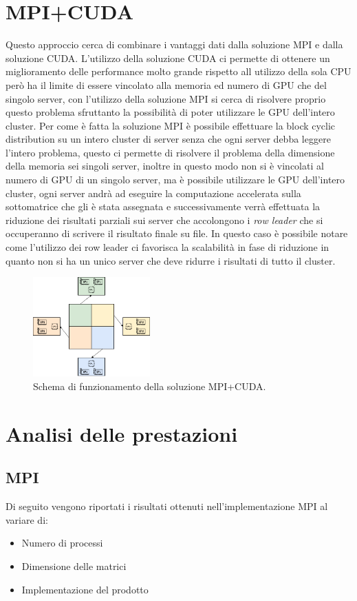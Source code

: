\documentclass[conference]{IEEEtran}
\begin{document}
\section{MPI+CUDA}
Questo approccio cerca di combinare i vantaggi dati dalla soluzione MPI e dalla soluzione CUDA. L'utilizzo della soluzione CUDA ci permette di ottenere un miglioramento delle performance molto grande rispetto all utilizzo della sola CPU però ha il limite di essere vincolato alla memoria ed numero di GPU che del singolo server, con l'utilizzo della soluzione MPI si cerca di risolvere proprio questo problema sfruttanto la possibilità di poter utilizzare le GPU dell'intero cluster. Per come è fatta la soluzione MPI è possibile effettuare la block cyclic distribution su un intero cluster di server senza che ogni server debba leggere l'intero problema, questo ci permette di risolvere il problema della dimensione della memoria sei singoli server, inoltre in questo modo non si è vincolati al numero di GPU di un singolo server, ma è possibile utilizzare le GPU dell'intero cluster, ogni server andrà ad eseguire la computazione accelerata sulla sottomatrice che gli è stata assegnata e successivamente verrà effettuata la riduzione dei risultati parziali sui server che accolongono i \textit{row leader} che si occuperanno di scrivere il risultato finale su file. In questo caso è possibile notare come l'utilizzo dei row leader ci favorisca la scalabilità in fase di riduzione in quanto non si ha un unico server che deve ridurre i risultati di tutto il cluster.
\begin{figure}[H]
    \centering
    \includegraphics[width=0.4\textwidth]{resources/mpi_cuda.png}
    \caption{Schema di funzionamento della soluzione MPI+CUDA.}
    \label{fig:mpi_cuda_scheme}
\end{figure}

\section{Analisi delle prestazioni}
\subsection{MPI}
Di seguito vengono riportati i risultati ottenuti nell'implementazione MPI al variare di:
\begin{itemize}
    \item Numero di processi
    \item Dimensione delle matrici
    \item Implementazione del prodotto
\end{itemize}
\end{document}
